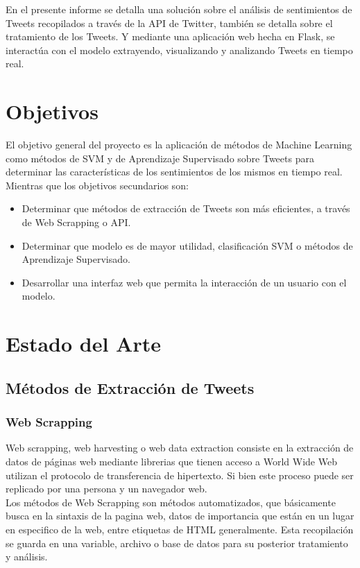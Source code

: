 \documentclass[a4paper,12pt]{article}
\theoremstyle{definition}
\theoremstyle{remark}
\begin{document}
En el presente informe se detalla una solución sobre el análisis de sentimientos de Tweets recopilados a través de la API de Twitter, también se detalla sobre el tratamiento de los Tweets. Y mediante una aplicación web hecha en Flask, se interactúa con el modelo extrayendo, visualizando y analizando Tweets en tiempo real.

\section{Objetivos}

El objetivo general del proyecto es la aplicación de métodos de Machine Learning como métodos de SVM y de Aprendizaje Supervisado sobre Tweets para determinar las características de los sentimientos de los mismos en tiempo real.\\

Mientras que los objetivos secundarios son:

\begin{itemize}
    \item Determinar que métodos de extracción de Tweets son más eficientes, a través de Web Scrapping o API.
    \item Determinar que modelo es de mayor utilidad, clasificación SVM o métodos de Aprendizaje Supervisado.
    \item Desarrollar una interfaz web que permita la interacción de un usuario con el modelo.
\end{itemize}

\section{Estado del Arte}
\subsection{Métodos de Extracción de Tweets}
\subsubsection{Web Scrapping}
Web scrapping, web harvesting o web data extraction consiste en la extracción de datos de páginas web mediante librerias que tienen acceso a World Wide Web utilizan el protocolo de transferencia de hipertexto. Si bien este proceso puede ser replicado por una persona y un navegador web.\\

Los métodos de Web Scrapping son métodos automatizados, que básicamente busca en la sintaxis de la pagina web, datos de importancia que están en un lugar en especifico de la web, entre etiquetas de HTML generalmente. Esta recopilación se guarda en una variable, archivo o base de datos para su posterior tratamiento y análisis.
\end{document}
